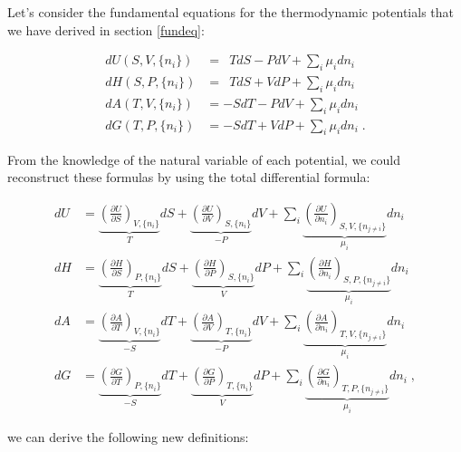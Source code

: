 \documentclass[
  9pt,
]{extbook}
\theoremstyle{definition}
\theoremstyle{definition}
\theoremstyle{definition}
\theoremstyle{remark}
\begin{document}
Let's consider the fundamental equations for the thermodynamic potentials that we have derived in section \ref{fundeq}:

\begin{equation}
\begin{aligned}
dU(S,V,\{n_i\}) &= \enspace T dS -P dV + \sum_i \mu_i dn_i \\
dH(S,P,\{n_i\}) &= \enspace T dS + V dP + \sum_i \mu_i dn_i \\
dA(T,V,\{n_i\}) &= -S dT -P dV + \sum_i \mu_i dn_i \\
dG(T,P,\{n_i\}) &= -S dT + V dP + \sum_i \mu_i dn_i\;.
\end{aligned}
\label{eq:dhagchem1}
\end{equation}

From the knowledge of the natural variable of each potential, we could reconstruct these formulas by using the total differential formula:

\begin{equation}
\begin{aligned}
dU &= \underbrace{\left(\frac{\partial U}{\partial S} \right)_{V,\{n_i\}}}_{T} dS + \underbrace{\left(\frac{\partial U}{\partial V} \right)_{S,\{n_i\}}}_{-P} dV + \sum_i \underbrace{\left(\frac{\partial U}{\partial n_i} \right)_{S,V,\{n_{j \neq i}\}}}_{\mu_i} dn_i \\
dH &= \underbrace{\left(\frac{\partial H}{\partial S} \right)_{P,\{n_i\}}}_{T} dS + \underbrace{\left(\frac{\partial H}{\partial P} \right)_{S,\{n_i\}}}_{V} dP + \sum_i \underbrace{\left(\frac{\partial H}{\partial n_i} \right)_{S,P,\{n_{j \neq i}\}}}_{\mu_i} dn_i \\
dA &= \underbrace{\left(\frac{\partial A}{\partial T} \right)_{V,\{n_i\}}}_{-S} dT + \underbrace{\left(\frac{\partial A}{\partial V} \right)_{T,\{n_i\}}}_{-P} dV + \sum_i \underbrace{\left(\frac{\partial A}{\partial n_i} \right)_{T,V,\{n_{j \neq i}\}}}_{\mu_i} dn_i \\
dG &= \underbrace{\left(\frac{\partial G}{\partial T} \right)_{P,\{n_i\}}}_{-S} dT + \underbrace{\left(\frac{\partial G}{\partial P} \right)_{T,\{n_i\}}}_{V} dP + \sum_i \underbrace{\left(\frac{\partial G}{\partial n_i} \right)_{T,P,\{n_{j \neq i}\}}}_{\mu_i} dn_i\;,
\end{aligned}
\label{eq:dhagchem2}
\end{equation}

we can derive the following new definitions:
\end{document}
